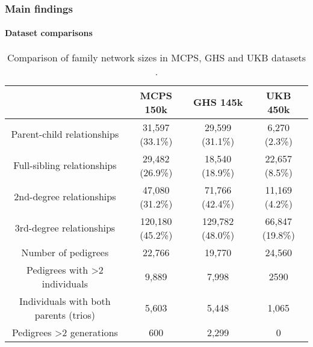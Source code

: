 \begin{frame}
    \frametitle{Main findings}
    \framesubtitle{Dataset comparisons}

    \begin{table}[]
    \caption{Comparison of family network sizes in MCPS, GHS and UKB datasets \parencite{ziyatdinov2023}.}
    \begin{tabular}{@{}cccc@{}}
    \toprule
    \textbf{}                                  & \textbf{MCPS   150k} & \textbf{GHS   145k} & \textbf{UKB   450k} \\ \midrule
    Parent-child relationships                 & 31,597 (33.1\%)      & 29,599 (31.1\%)     & 6,270 (2.3\%)       \\
    Full-sibling relationships                 & 29,482 (26.9\%)      & 18,540 (18.9\%)     & 22,657 (8.5\%)      \\
    2nd-degree relationships                   & 47,080 (31.2\%)      & 71,766 (42.4\%)     & 11,169 (4.2\%)      \\
    3rd-degree relationships                   & 120,180 (45.2\%)     & 129,782 (48.0\%)    & 66,847 (19.8\%)     \\
    Number of pedigrees                        & 22,766               & 19,770              & 24,560              \\
    Pedigrees with \textgreater{}2 individuals & 9,889                & 7,998               & 2590                \\
    Individuals with both parents (trios)      & 5,603                & 5,448               & 1,065               \\
    Pedigrees \textgreater{}2 generations      & 600                  & 2,299               & 0                   \\ \bottomrule
    \end{tabular}
    \label{tab:comparison-families}
    \end{table}
\end{frame}